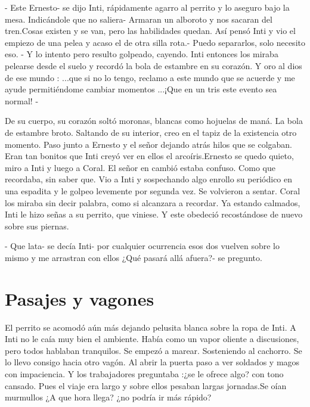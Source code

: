 - Este Ernesto- se dijo Inti, rápidamente agarro al perrito y lo aseguro bajo la mesa. Indicándole que no saliera- Armaran un alboroto y nos sacaran del tren.Cosas existen y se van, pero las habilidades quedan. Así pensó Inti y vio el empiezo de una pelea y acaso el de otra silla rota.- Puedo separarlos, solo necesito eso. - Y lo intento pero resulto golpeado, cayendo. Inti entonces los miraba pelearse desde el suelo y recordó la bola de estambre en su corazón. Y oro al dios de ese mundo : ...que si no lo tengo, reclamo a este mundo que se acuerde y me ayude permitiéndome cambiar momentos ...¡Que en un tris este evento sea normal! -

De su cuerpo, su corazón soltó moronas, blancas como hojuelas de maná. La bola de estambre broto. Saltando de su interior, creo en el tapiz de la existencia otro momento. Paso junto a Ernesto y el señor dejando atrás hilos que se colgaban. Eran tan bonitos que Inti creyó ver en ellos el arcoíris.Ernesto se quedo quieto, miro a Inti y luego a Coral. El señor en cambió estaba confuso. Como que recordaba, sin saber que. Vio a Inti y sospechando algo enrollo su periódico en una espadita y le golpeo levemente por segunda vez. Se volvieron a sentar. Coral los miraba sin decir palabra, como si alcanzara a recordar. Ya estando calmados, Inti le hizo señas a su perrito, que viniese. Y este obedeció recostándose de nuevo sobre sus piernas.

- Que lata- se decía Inti- por cualquier ocurrencia esos dos vuelven sobre lo mismo y me arrastran con ellos ¿Qué pasará allá afuera?- se pregunto.



\chapter{Pasajes y vagones}
El perrito se acomodó aún más dejando pelusita blanca sobre la ropa de Inti. A Inti no le caía muy bien el ambiente. Había como un vapor oliente a discusiones, pero todos hablaban tranquilos. Se empezó a marear. Sosteniendo al cachorro. Se lo llevo consigo hacia otro vagón. Al abrir la puerta paso a ver soldados y magos con impaciencia. Y los trabajadores preguntaba :¿se le ofrece algo? con tono cansado. Pues el viaje era largo y sobre ellos pesaban largas jornadas.Se oían murmullos ¿A que hora llega? ¿no podría ir más rápido?

